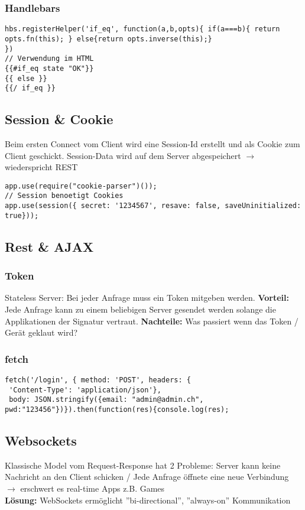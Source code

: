 \subsubsection{Handlebars}
\begin{lstlisting}
hbs.registerHelper('if_eq', function(a,b,opts){ if(a===b){ return opts.fn(this); } else{return opts.inverse(this);}
})
// Verwendung im HTML
{{#if_eq state "OK"}}
{{ else }}
{{/ if_eq }}
\end{lstlisting}



\subsection{Session \& Cookie}
Beim ersten Connect vom Client wird eine Session-Id erstellt und als Cookie zum Client geschickt. Session-Data wird auf dem Server abgespeichert $\rightarrow$ wiederspricht REST
\begin{lstlisting}
app.use(require("cookie-parser")());
// Session benoetigt Cookies
app.use(session({ secret: '1234567', resave: false, saveUninitialized: true}));
\end{lstlisting}



\subsection{Rest \& AJAX}
\subsubsection{Token}
Stateless Server: Bei jeder Anfrage muss ein Token mitgeben werden.
\textbf{Vorteil:} Jede Anfrage kann zu einem beliebigen Server gesendet werden solange die Applikationen der Signatur vertraut. \textbf{Nachteile:} Was passiert wenn das Token / Gerät geklaut wird?


\subsubsection{fetch}
\begin{lstlisting}
fetch('/login', { method: 'POST', headers: {
 'Content-Type': 'application/json'},
 body: JSON.stringify({email: "admin@admin.ch",
pwd:"123456"})}).then(function(res){console.log(res);
\end{lstlisting}


\subsection{Websockets}
Klassische Model vom Request-Response hat 2 Probleme:
Server kann keine Nachricht an den Client schicken /
Jede Anfrage öffnete eine neue Verbindung $\rightarrow$ erschwert es real-time Apps z.B. Games\\
\textbf{Lösung:} WebSockets ermöglicht ''bi-directional'', ''always-on'' Kommunikation

\vfill
$ $ 
\columnbreak